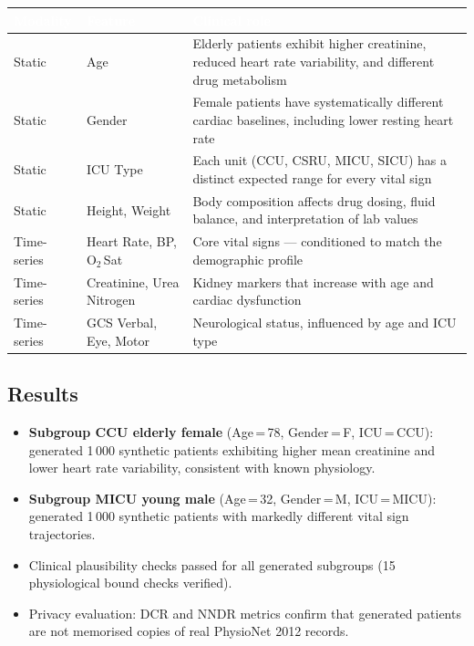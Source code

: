 \documentclass[12pt, a4paper]{article}
\begin{document}
\begin{table}[H]
\centering
\renewcommand{\arraystretch}{1.4}
\begin{tabularx}{\linewidth}{L{2.2cm} L{3.5cm} X}
\toprule
{}
\textcolor{white}{\textbf{Modality}} &
\textcolor{white}{\textbf{Feature}} &
\textcolor{white}{\textbf{Clinical role}} \\
\midrule
{}
Static & Age &
Elderly patients exhibit higher creatinine, reduced heart rate variability,
and different drug metabolism \\
Static & Gender &
Female patients have systematically different cardiac baselines,
including lower resting heart rate \\
Static & ICU Type &
Each unit (CCU, CSRU, MICU, SICU) has a distinct expected range
for every vital sign \\
Static & Height, Weight &
Body composition affects drug dosing, fluid balance,
and interpretation of lab values \\
Time-series & Heart Rate, BP, O$_2$\,Sat &
Core vital signs --- conditioned to match the demographic profile \\
Time-series & Creatinine, Urea Nitrogen &
Kidney markers that increase with age and cardiac dysfunction \\
Time-series & GCS Verbal, Eye, Motor &
Neurological status, influenced by age and ICU type \\
\bottomrule
\end{tabularx}
\end{table}

\subsection{Results}

\begin{itemize}[itemsep=3pt]
    \item \textbf{Subgroup CCU elderly female} (Age\,=\,78, Gender\,=\,F,
          ICU\,=\,CCU): generated 1\,000 synthetic patients exhibiting
          higher mean creatinine and lower heart rate variability,
          consistent with known physiology.
    \item \textbf{Subgroup MICU young male} (Age\,=\,32, Gender\,=\,M,
          ICU\,=\,MICU): generated 1\,000 synthetic patients with
          markedly different vital sign trajectories.
    \item Clinical plausibility checks passed for all generated subgroups
          (15 physiological bound checks verified).
    \item Privacy evaluation: DCR and NNDR metrics confirm that generated
          patients are not memorised copies of real PhysioNet 2012 records.
\end{itemize}
\end{document}
